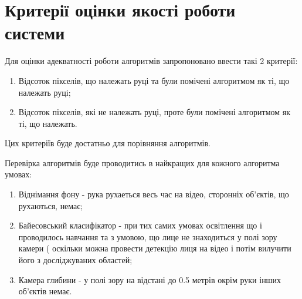 \section{Критерії оцінки якості роботи системи}

Для оцінки адекватності роботи алгоритмів запропоновано ввести такі 2 критерії:
\begin{enumerate}
	\item Відсоток пікселів, що належать руці та були помічені алгоритмом як ті, що належать руці;
	\item Відсоток пікселів, які не належать руці, проте були помічені алгоритмом як ті, що належать.
\end{enumerate}

Цих критеріїв буде достатньо для порівняння алгоритмів.

Перевірка алгоритмів буде проводитись в найкращих для кожного алгоритма умовах:
\begin{enumerate}
	\item Віднімання фону - рука рухаеться весь час на відео, сторонніх об'єктів, що рухаються, немає;
	\item Байесовський класифікатор - при тих самих умовах освітлення що і проводилось навчання та з умовою, що лице не знаходиться у полі зору камери ( оскільки можна провести детекцію лиця на відео і потім вилучити його з досліджуваних областей;
	\item Камера глибини - у полі зору на відстані до 0.5 метрів окрім руки інших об'єктів немає.
\end{enumerate}